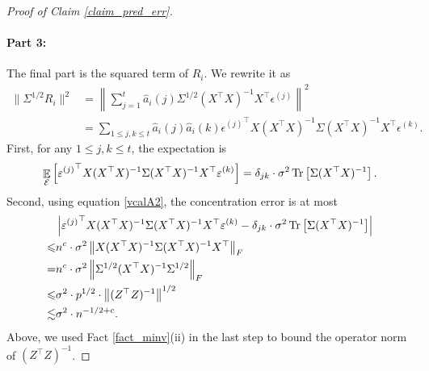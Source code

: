 \begin{proof}[Proof of Claim \ref{claim_pred_err}]
	\paragraph{Part 3:} The final part is the squared term of $R_i$. We rewrite it as
	\begin{align}
	\|\Sigma^{1/2}R_i\|^2 &= \left\|\sum_{j=1}^t \hat{a}_i(j) \Sigma^{1/2}(X^{\top} X)^{-1} X^{\top} \epsilon^{(j)}\right\|^2 \nonumber\\
	& = \sum_{1\le j , k \le t}\hat a_i(j) \hat a_i(k)  {\epsilon^{(j)}}^\top X(X^{\top} X)^{-1}\Sigma (X^{\top} X)^{-1} X^{\top} {\epsilon^{(k)}}.\label{E_i^2}
	\end{align}	
	First, for any $1 \le j, k \le t$, the expectation is
	$$\mathop{\mathbb{E}}_{\mathcal E}\left[ {\varepsilon^{(j)}}^\top X(X^{\top} X)^{-1}\Sigma (X^{\top} X)^{-1} X^{\top} \varepsilon^{(k)} \right]=\delta_{jk}\cdot \sigma^2\operatorname{Tr}\left[\Sigma(X^\top X)^{-1}\right] .$$
	Second, using equation \eqref{vcalA2}, the concentration error is at most
	\begin{align}
	& \left|{\varepsilon^{(j)}}^\top X(X^{\top} X)^{-1}\Sigma (X^{\top} X)^{-1} X^{\top} {\varepsilon^{(k)}} -\delta_{jk}\cdot \sigma^2\operatorname{Tr}\left[\Sigma(X^\top X)^{-1}\right]\right|\nonumber \\
	\leqslant &n^c\cdot \sigma^2  \left\| X(X^{\top} X)^{-1}\Sigma (X^{\top} X)^{-1} X^{\top}  \right\|_{F} \nonumber \\
	 = & n^c\cdot \sigma^2  \left\| \Sigma^{1/2}(X^{\top} X)^{-1}\Sigma^{1/2} \right\|_{F} \nonumber\\
	  \leqslant &\sigma^2 \cdot p^{1/2} \cdot  \left\| (Z^{\top} Z)^{-1} \right\|^{1/2} \nonumber\\
	  \lesssim &\sigma^2 \cdot n^{-1/2+c}. \label{jeqk}
	\end{align}
	Above, we used Fact \ref{fact_minv}(ii) in the last step to bound the operator norm of $(Z^{\top} Z)^{-1}$.

\end{proof}
